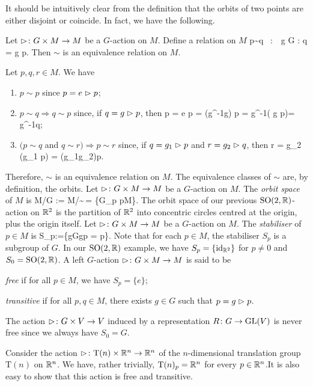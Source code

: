 It should be intuitively clear from the definition that the orbits of two points are either disjoint or coincide. In fact, we have the following.

\bp
Let $\vartriangleright \colon G\times M \to M$ be a $G$-action on $M$. Define a relation on $M$
\bse
p\sim q \ :\Leftrightarrow \ \exists \, g \in G : q = g \lacts p.
\ese
Then $\sim$ is an equivalence relation on $M$.
\ep

\bq
Let $p,q,r\in M$. We have
\begin{enumerate}[label=\roman*)]
\item $p\sim p$ since $p = e \vartriangleright p$;
\item $p\sim q \Rightarrow q\sim p$ since, if $q =g \vartriangleright p$, then
\bse
p = e \lacts p = (g^{-1}\bullet g) \lacts p = g^{-1}\lacts( g \lacts p)= g^{-1}\lacts q; 
\ese
\item $(p\sim q$ and $q\sim r) \Rightarrow p\sim r$ since, if $q =g_1 \vartriangleright p$ and $r =g_2 \vartriangleright q$, then
\bse
r = g_2 \lacts (g_1 \lacts p) = (g_1\bullet g_2)\lacts p.
\ese
\end{enumerate}
Therefore, $\sim$ is an equivalence relation on $M$.
\eq
The equivalence classes of $\sim$ are, by definition, the orbits.
\bd
Let $\vartriangleright\colon G\times M\to M$ be a $G$-action on $M$. The \emph{orbit space} of $M$ is
\bse
M/G := M/\!\sim \,= \{G_p \mid p\in M\}.
\ese
\ed
\be
The orbit space of our previous $\operatorname{SO}(2,\mathbb{R})$-action on $\mathbb{R}^2$ is the partition of $\mathbb{R}^2$ into concentric circles centred at the origin, plus the origin itself.
\ee
\bd
Let $\vartriangleright\colon G\times M\to M$ be a $G$-action on $M$. The \emph{stabiliser} of $p\in M$ is
\bse
S_p:=\{g\in G\mid g\lacts p = p\}.
\ese
\ed
Note that for each $p\in M$, the stabiliser $S_p$ is a subgroup of $G$.
\be
In our $\operatorname{SO}(2,\mathbb{R})$ example, we have $S_p=\{\operatorname{id}_{\mathbb{R}^2}\}$ for $p\neq 0$ and $S_0=\operatorname{SO}(2,\mathbb{R})$.
\ee
\bd
A left $G$-action $\vartriangleright\colon G\times M\to M$ is said to be
\ben[label=\roman*)]
\item \emph{free} if for all $p\in M$, we have $S_p=\{e\}$;
\item \emph{transitive} if for all $p,q\in M$, there exists $g\in G$ such that $p=g\vartriangleright p$.
\een
\ed

\be
The action $\vartriangleright\colon G\times V \to V$ induced by a representation $R\colon G\to \operatorname{GL}(V)$ is never free since we always have $S_0=G$.
\ee

\be
Consider the action $\vartriangleright\colon \mathrm{T}(n)\times \mathbb{R}^n\to \mathbb{R}^n$ of the $n$-dimensional translation group $\mathrm{T}(n)$ on $\mathbb{R}^n$. We have, rather trivially, $\mathrm{T}(n)_p=\mathbb{R}^n$ for every $p\in \mathbb{R}^n$.It is also easy to show that this action is free and transitive. 
\ee

